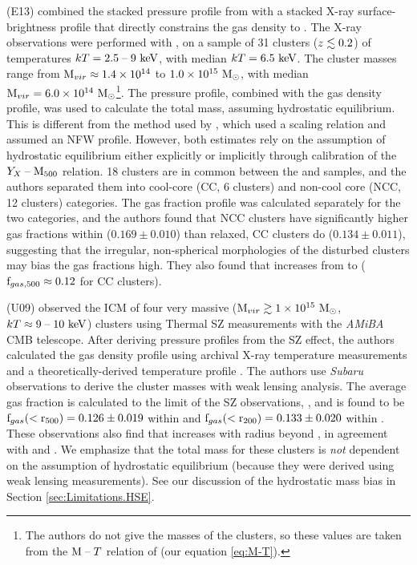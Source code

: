 \textbf{\citet{Eckert2013b}} (E13) combined the stacked pressure
profile from \citet{PlanckIntV} with a stacked X-ray
surface-brightness profile that directly constrains the gas density to
\rtwo{}. The X-ray observations were performed with \Rosat{}, on a
sample of 31 clusters ($z\lesssim0.2$) of temperatures $kT =
2.5\;\textrm{--}\;9~\textrm{keV}$, with median $kT = 6.5~\textrm{keV}$. The cluster masses range
from $\textrm{M\ensuremath{_{vir}}} \approx 1.4 \times 10^{14}$ to $1.0 \times 10^{15}~\textrm{M}_\odot$, with
median $\textrm{M\ensuremath{_{vir}}} = 6.0\times 10^{14}~\textrm{M}_\odot$\footnote{The authors do not give
  the masses of the clusters, so these values are taken from the
  $\textrm{M}{}\;\textrm{--}\;{}T$ relation of \citet{Vikhlinin2006} (our equation
  \ref{eq:M-T}).}. The \Planck{} pressure profile, combined with the
gas density profile, was used to calculate the total mass, assuming
hydrostatic equilibrium. This is different from the method used by
\citet{PlanckIntV}, which used a scaling relation and assumed an NFW
profile. However, both estimates rely on the assumption of hydrostatic
equilibrium either explicitly or implicitly through calibration of the
$Y_X\;\textrm{--}\;\textrm{M\ensuremath{_{500}}}$ relation. 18 clusters are in common
between the \Rosat{} and \Planck{} samples, and the authors separated
them into cool-core (CC, 6 clusters) and non-cool core (NCC, 12
clusters) categories. The gas fraction profile was calculated
separately for the two categories, and the authors found that NCC
clusters have significantly higher gas fractions within \rtwo{}
($0.169 \pm 0.010$) than relaxed, CC clusters do ($0.134\pm 0.011$),
suggesting that the irregular, non-spherical morphologies of the
disturbed clusters may bias the gas fractions high. They also found
that \fg{} increases from \rfive{} to \rtwo{} ($\textrm{f\ensuremath{_{gas,500}}} \approx
0.12$ for CC clusters).

\textbf{\citet{Umetsu2009}} (U09) observed the ICM of four very
massive ($\textrm{M\ensuremath{_{vir}}} \gtrsim 1\times 10^{15}~\textrm{M}_\odot$, $kT \approx 9\;\textrm{--}\;10~\textrm{keV}$)
clusters using Thermal SZ measurements with the \textit{AMiBA} CMB
telescope. After deriving pressure profiles from the SZ effect, the
authors calculated the gas density profile using archival X-ray
temperature measurements and a theoretically-derived temperature
profile \citep{Komatsu2001}. The authors use \textit{Subaru}
observations to derive the cluster masses with weak lensing
analysis. The average gas fraction is calculated to the limit of the
SZ observations, \rtwo, and is found to be $\textrm{f\ensuremath{_{gas}}}(<\textrm{r\ensuremath{_{500}}}) = 0.126 \pm
0.019$ within \rfive{} and $\textrm{f\ensuremath{_{gas}}}(<\textrm{r\ensuremath{_{200}}}) = 0.133 \pm 0.020$ within
\rtwo{}. These observations also find that \fg{} increases with radius
beyond \rfive{}, in agreement with \citet{PlanckIntV} and
\citet{Eckert2013b}. We emphasize that the total mass for these
clusters is \textit{not} dependent on the assumption of hydrostatic
equilibrium (because they were derived using weak lensing
measurements). See our discussion of the hydrostatic mass bias in
Section \ref{sec:Limitations.HSE}.

